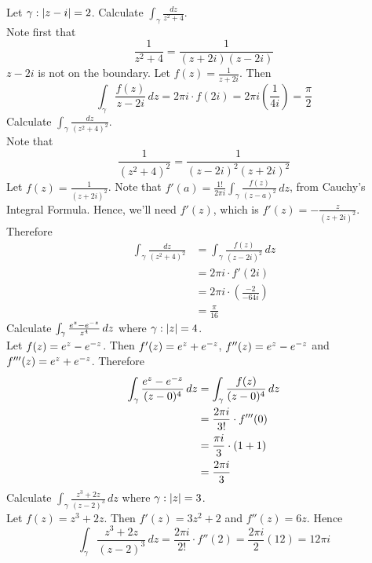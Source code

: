 \documentclass[12pt]{article}
\begin{document}
Let $\gamma: \abs{z-i} = 2$. Calculate $\int_\gamma \frac{dz}{z^2 + 4}$. 
\\ Note first that $$ \frac{1}{z^2 + 4} = \frac{1}{(z+2i)(z-2i)}$$ 
$z-2i$ is not on the boundary. Let $f(z) = \frac{1}{z+2i}$. Then 
$$ \int_\gamma \frac{f(z)}{z-2i} \, dz = 2\pi i \cdot f(2i) = 2\pi i (\frac{1}{4i}) = \frac{\pi}{2} $$ 
Calculate $\int_\gamma \frac{dz}{(z^2 + 4)^2} $. \\
Note that $$ \frac{1}{(z^2 + 4)^2} = \frac{1}{(z - 2i)^2(z+2i)^2} $$ Let $f(z) = \frac{1}{(z+2i)^2}$. Note that $f'(a) = \frac{1!}{2\pi i} \int_\gamma \frac{f(z)}{(z-a)^2}\, dz$, from Cauchy's Integral Formula. Hence, we'll need $f'(z)$, which is $f'(z) = -\frac{z}{(z+2i)^2} $. Therefore 
$$ \begin{aligned} \int_\gamma \frac{dz}{(z^2 + 4)^2} &= \int_\gamma \frac{f(z)}{(z-2i)^2} \, dz \\ &= 2\pi i \cdot f'(2i) \\ &= 2\pi i \cdot (\frac{-2}{-64i}) \\ &= \frac{\pi}{16} \end{aligned} $$ 
Calculate $\int_\gamma \frac{e^z - e^{-z}}{z^4} \, dz$ where $\gamma: \abs{z} = 4$. \\
Let $f(z) = e^z - e^{-z}$. Then $f'(z) = e^z + e^{-z}$, $f''(z) = e^z - e^{-z}$ and $f'''(z) = e^z + e^{-z}$. Therefore $$ \begin{aligned} \int_\gamma \frac{e^z - e^{-z}}{(z-0)^4} \, dz &= \int_\gamma \frac{f(z)}{(z-0)^4}\, dz \\ &= \frac{2\pi i}{3!} \cdot f'''(0) \\ &= \frac{\pi i}{3} \cdot (1+1) \\ &= \frac{2\pi i}{3} \end{aligned} $$ 
Calculate $\int_\gamma \frac{z^3 + 2z}{(z-2)^3} \, dz$ where $\gamma: \abs{z} = 3$. \\
Let $f(z) = z^3 + 2z$. Then $f'(z) = 3z^2 + 2$ and $f''(z) = 6z$. Hence 
$$ \int_\gamma \frac{z^3 + 2z}{(z-2)^3} \, dz = \frac{2\pi i}{2!} \cdot f''(2) = \frac{2\pi i}{2} (12) = 12\pi i $$ 
\end{document}

